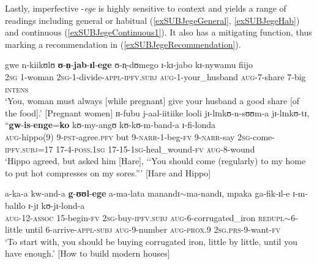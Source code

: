 Lastly, imperfective -\textit{ege} is highly sensitive to context and yields a range of readings including general or habitual (\ref{exSUBJegeGeneral}, \ref{exSUBJegeHab}) and continuous (\ref{exSUBJegeContinuous1}). It also has a mitigating function, thus marking a recommendation in (\ref{exSUBJegeRecommendation}).
\begin{exe}
\ex  \label{exSUBJegeGeneral} \gll gwe n-kiikʊlʊ \textbf{ʊ}-\textbf{n̩}-\textbf{jab}-\textbf{ɪl}-\textbf{ege} ʊ-n̩-dʊmego ɪ-kɪ-jabo kɪ-nywamu fiijo\\
\textsc{2sg} 1-woman \textsc{2sg}-1-divide-\textsc{appl}-\textsc{ipfv.subj} \textsc{aug}-1-your\_husband \textsc{aug}-7-share 7-big \textsc{intens}\\
\glt `You, woman must always [while pregnant] give your husband a good share [of the food].' [Pregnant women]
\ex \label{exSUBJegeHab} \gll ɪɪ-fubu j-aal-iitiike looli jɪ-lɪnkʊ-n-sʊʊm-a jɪ-lɪnkʊ-tɪ, ``\textbf{gw}-\textbf{is}-\textbf{enge}=\textbf{ko} kʊ-my-angʊ kʊ-kʊ-m-band-a ɪ-fi-londa\\
\textsc{aug}-hippo(9) 9-\textsc{pst}-agree.\textsc{pfv} but 9-\textsc{narr}-1-beg-\textsc{fv} 9-\textsc{narr}-say \phantom{\lq\lq}\textsc{2sg}-come-\textsc{ipfv.subj}=17 17-4-\textsc{poss.1sg} 17-15-\textsc{1sg}-heal\_wound-\textsc{fv} \textsc{aug}-8-wound\\
\glt `Hippo agreed, but asked him [Hare], \textup{\lq\lq}You should come (regularly) to my home to put hot compresses on my sores.\textup{''}' [Hare and Hippo]

\ex \label{exSUBJegeContinuous1} \gll a-ka-a kw-and-a \textbf{g}-\textbf{ʊʊl}-\textbf{ege} a-ma-lata manandɪ$\sim$ma-nandɪ, mpaka ga-fik-ɪl-e ɪ-m-balɪlo ɪ-jɪ kʊ-jɪ-lond-a\\
\textsc{aug}-12-\textsc{assoc} 15-begin-\textsc{fv} \textsc{2sg}-buy-\textsc{ipfv.subj} \textsc{aug}-6-corrugated\_iron \textsc{redupl}$\sim$6-little until 6-arrive-\textsc{appl}-\textsc{subj} \textsc{aug}-9-number \textsc{aug}-\textsc{prox.9} \textsc{2sg.prs}-9-want-\textsc{fv}\\
\glt `To start with, you should be buying corrugated iron, little by little, until you have enough.' [How to build modern houses]


\end{exe}
